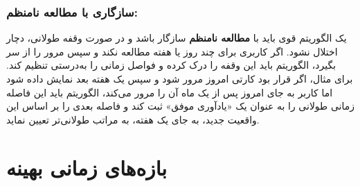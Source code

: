 \documentclass[12pt]{report}
\begin{document}
\subsubsection{سازگاری با مطالعه نامنظم:} یک الگوریتم قوی باید با \textbf{مطالعه نامنظم} سازگار باشد و در صورت وقفه طولانی، دچار اختلال نشود. اگر کاربری برای چند روز یا هفته مطالعه نکند و سپس مرور را از سر بگیرد، الگوریتم باید این وقفه را درک کرده و فواصل زمانی را به‌درستی تنظیم کند. برای مثال، اگر قرار بود کارتی امروز مرور شود و سپس یک هفته بعد نمایش داده شود اما کاربر به جای امروز پس از یک ماه آن را مرور می‌کند، الگوریتم باید این فاصله زمانی طولانی را به عنوان یک  «یادآوری موفق» ثبت کند و فاصله بعدی را بر اساس این واقعیت جدید، به جای یک هفته، به مراتب طولانی‌تر تعیین نماید.

\section{بازه‌های زمانی بهینه}



\end{document}

